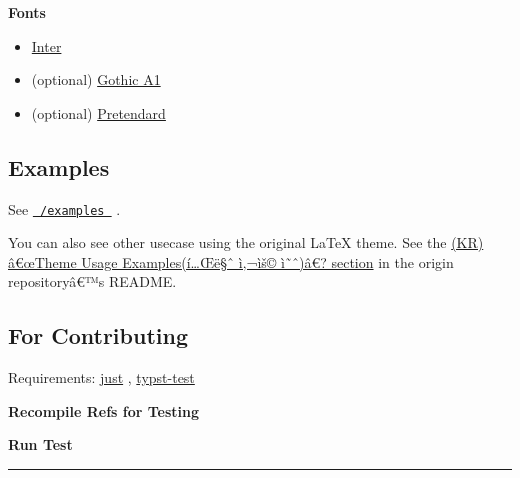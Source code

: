 \textbf{Fonts}

\begin{itemize}
\tightlist
\item
  \href{https://fonts.google.com/specimen/Inter}{Inter}
\item
  (optional) \href{https://fonts.google.com/specimen/Gothic+A1}{Gothic
  A1}
\item
  (optional)
  \href{https://github.com/orioncactus/pretendard/blob/main/packages/pretendard/docs/en/README.md}{Pretendard}
\end{itemize}

\subsection{Examples}\label{examples}

See
\href{https://github.com/typst/packages/raw/main/packages/preview/ucpc-solutions/0.1.0/examples/}{\texttt{\ /examples\ }}
.

You can also see other usecase using the original LaTeX theme. See the
\href{https://github.com/ucpcc/2020-solutions-theme\#\%ED\%85\%8C\%EB\%A7\%88-\%EC\%82\%AC\%EC\%9A\%A9-\%EC\%98\%88}{(KR)
â€œTheme Usage Examples(í\ldots Œë§ˆ ì‚¬ìš© ì˜ˆ)â€? section} in the
origin repositoryâ€™s README.

\subsection{For Contributing}\label{for-contributing}

Requirements: \href{https://github.com/casey/just}{just} ,
\href{https://github.com/tingerrr/typst-test}{typst-test}

\textbf{Recompile Refs for Testing}

\begin{Shaded}
\begin{Highlighting}[]
\end{Highlighting}
\end{Shaded}

\textbf{Run Test}

\begin{Shaded}
\begin{Highlighting}[]
\end{Highlighting}
\end{Shaded}

\begin{center}\rule{0.5\linewidth}{0.5pt}\end{center}


